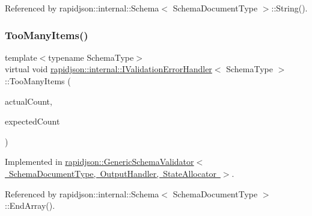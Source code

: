 Referenced by rapidjson\+::internal\+::\+Schema$<$ Schema\+Document\+Type $>$\+::\+String().

\mbox{\label{classrapidjson_1_1internal_1_1_i_validation_error_handler_aedeac4d4c121dba2153d22e1f38dbe70}} 
\subsubsection{\texorpdfstring{TooManyItems()}{TooManyItems()}}
{\footnotesize\ttfamily template$<$typename Schema\+Type$>$ \\
virtual void \mbox{\hyperlink{classrapidjson_1_1internal_1_1_i_validation_error_handler}{rapidjson\+::internal\+::\+I\+Validation\+Error\+Handler}}$<$ Schema\+Type $>$\+::Too\+Many\+Items (\begin{DoxyParamCaption}\item[{\mbox{\hyperlink{namespacerapidjson_a44eb33eaa523e36d466b1ced64b85c84}{Size\+Type}}}]{actual\+Count,  }\item[{\mbox{\hyperlink{namespacerapidjson_a44eb33eaa523e36d466b1ced64b85c84}{Size\+Type}}}]{expected\+Count }\end{DoxyParamCaption})\hspace{0.3cm}{\ttfamily [pure virtual]}}



Implemented in \mbox{\hyperlink{classrapidjson_1_1_generic_schema_validator_a17d9808adb5cdd5e9a253b309b10b570}{rapidjson\+::\+Generic\+Schema\+Validator$<$ Schema\+Document\+Type, Output\+Handler, State\+Allocator $>$}}.



Referenced by rapidjson\+::internal\+::\+Schema$<$ Schema\+Document\+Type $>$\+::\+End\+Array().

\mbox{\label{classrapidjson_1_1internal_1_1_i_validation_error_handler_af2cb1441d41085df755231be01964b5d}} 
